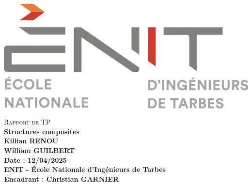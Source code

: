 \documentclass[a4paper,12pt]{article}
\begin{document}
\begin{titlepage}
    \begin{minipage}[t]{0.4\textwidth}
        \includegraphics[width=\textwidth]{media/logo-enit-2454399073.png} \\[1cm] %
    \end{minipage}
    \centering
    \vspace*{2cm}
    
    {\scshape \Large Rapport de TP} \\[0.5cm] %
    {\Huge \textbf{Structures composites}} \\[1.5cm] %
    {\large \textbf{Killian RENOU \\ William GUILBERT}} \\[0.5cm] %
    {\large \textbf{Date : 12/04/2025}} \\[0.5cm] %
    {\large \textbf{ENIT - École Nationale d'Ingénieurs de Tarbes}} \\[0.5cm] %
    \vfill
    {\large \textbf{Encadrant : Christian GARNIER}} %
\end{titlepage}
\end{document}
